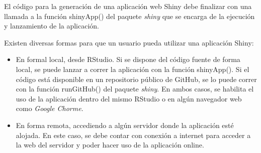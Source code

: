 El código para la generación de una aplicación web Shiny debe finalizar con una llamada a la función \textcolor{fandango}{shinyApp()} del paquete \emph{shiny} que se encarga de la ejecución y lanzamiento de la aplicación.

Existen diversas formas para que un usuario pueda utilizar una aplicación Shiny:

\begin{itemize}

\item En formal local, desde RStudio. Si se dispone del código fuente de forma local, se puede lanzar a correr la aplicación con la función \textcolor{fandango}{shinyApp()}. Si el código está disponible en un repositorio público de GitHub, se lo puede correr con la función \textcolor{fandango}{runGitHub()} del paquete \emph{shiny}. En ambos casos, se habilita el uso de la aplicación dentro del mismo RStudio o en algún navegador web como \emph{Google Chorme}.

\item En forma remota, accediendo a algún servidor donde la aplicación esté alojada. En este caso, se debe contar con conexión a internet para acceder a la web del servidor y poder hacer uso de la aplicación online.

\end{itemize}





